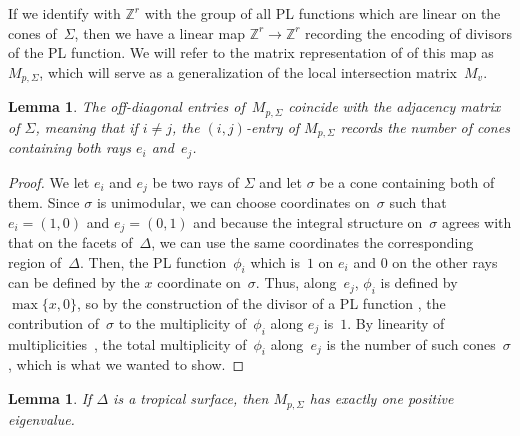 \documentclass[11pt]{amsart}
\newtheorem{lem}[thm]{Lemma}
\theoremstyle{definition}
\newcommand{\ZZ}{\mathbb Z}
\begin{document}
If we identify with $\ZZ^r$ with the group of all PL functions which are linear
on the cones of~$\Sigma$, then we have a linear map $\ZZ^r
\rightarrow \ZZ^r$ recording the encoding of divisors of the PL function. We
will refer to the matrix representation of of this map as $M_{p,\Sigma}$, which
will serve as a generalization of the local intersection matrix~$M_v$.

\begin{lem}\label{lem:link}
The off-diagonal entries of~$M_{p,\Sigma}$ coincide with the adjacency matrix of
$\Sigma$, meaning that if $i \neq j$, the $(i,j)$-entry of $M_{p,\Sigma}$
records the number of cones containing both rays $e_i$ and~$e_j$.
\end{lem}

\begin{proof}
We let $e_i$ and $e_j$ be two rays of $\Sigma$ and let $\sigma$ be a cone
containing both of them. Since $\sigma$ is unimodular, we can choose coordinates
on~$\sigma$ such that $e_i = (1,0)$ and $e_j = (0,1)$ and because the integral
structure on~$\sigma$ agrees with that on the facets of~$\Delta$, we can use the
same coordinates the corresponding region of~$\Delta$. Then, the PL
function~$\phi_i$ which is~$1$ on $e_i$ and $0$ on the other rays can be defined
by the $x$ coordinate on~$\sigma$. Thus, along~$e_j$, $\phi_i$ is defined by
$\max\{x, 0\}$, so by the construction of the divisor of a PL function
\cite[Prop.~4.5(iv)]{cartwright-complexes}, the contribution of~$\sigma$ to the
multiplicity of~$\phi_i$ along $e_j$ is~$1$. By linearity of
multiplicities~\cite[Prop.~4.5(i)]{cartwright-complexes}, the total multiplicity
of~$\phi_i$ along~$e_j$ is the number of such cones~$\sigma$, which is what we
wanted to show.
\end{proof}

\begin{lem}\label{lem:local-matrix}
If $\Delta$ is a tropical surface, then $M_{p,\Sigma}$ has exactly one positive
eigenvalue.
\end{lem}
\end{document}
